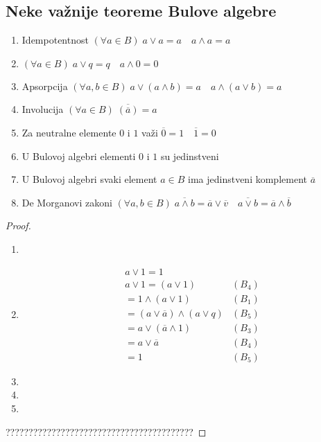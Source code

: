 \subsection{Neke važnije teoreme Bulove algebre}
\begin{theorem}
	\begin{enumerate}[label = \textbf{\arabic*.)}]
		\item Idempotentnost $(\forall a \in B) \; a \lor a = a \quad a\land a = a$
		\item $(\forall a \in B)\; a \lor q = q \quad a \land 0 = 0$
		\item Apsorpcija $(\forall a, b \in B)\; a \lor (a \land b) = a \quad a \land (a \lor b) = a$
		\item Involucija $(\forall a \in B)\; \overline{(\overline{a})} = a$
		\item Za neutralne elemente $0$ i $1$ važi $\overline{0} = 1 \quad \overline{1} = 0$
		\item U Bulovoj algebri elementi $0$ i $1$ su jedinstveni
		\item U Bulovoj algebri svaki element $a \in B$ ima jedinstveni komplement $\overline{a}$
		\item De Morganovi zakoni $(\forall a, b \in B)\; \overline{a \land b} = \overline{a} \lor \overline{v} \quad \overline{a \lor b} = \overline{a} \land \overline{b}$
	\end{enumerate}
\end{theorem}
\begin{proof}
	\begin{enumerate}[label = \textbf{\arabic*.)}]
		\item
		\item 
			\begin{align*}
				&a \lor 1 = 1\\
				&a \lor 1 = (a \lor 1) &(B_4)\\
				&= 1 \land (a \lor 1) &(B_1)\\
				&= (a \lor \overline{a}) \land (a \lor q) &(B_5)\\
				&= a \lor (\overline{a} \land 1) &(B_3)\\
				&= a \lor \overline{a} &(B_4)\\
				&= 1 &(B_5)
			\end{align*}
		\item
		\item
		\item
	\end{enumerate} 
	
		?????????????????????????????????????????
\end{proof}

